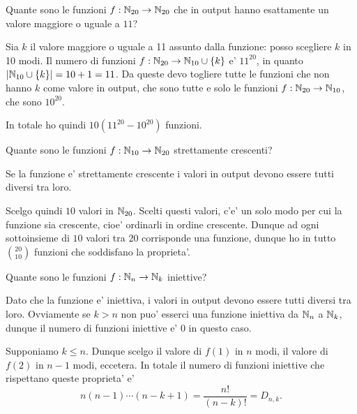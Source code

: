 \begin{example}
    Quante sono le funzioni $f : \mathbb{N}_{20} \to \mathbb{N}_{20}$ che in output hanno esattamente un valore maggiore o uguale a $11$?
\end{example}
\begin{solution}
    Sia $k$ il valore maggiore o uguale a 11 assunto dalla funzione: posso scegliere $k$ in 10 modi. Il numero di funzioni $f : \mathbb{N}_{20} \to \mathbb{N}_{10} \cup \{k\}$ e' $11^{20}$, in quanto $\left|\mathbb{N}_{10} \cup \{k\}\right| = 10 + 1 = 11$. Da queste devo togliere tutte le funzioni che non hanno $k$ come valore in output, che sono tutte e solo le funzioni $f : \mathbb{N}_{20} \to \mathbb{N}_{10}$, che sono $10^{20}$.

    In totale ho quindi $10(11^{20} - 10^{20})$ funzioni.
\end{solution}

\begin{example}
    Quante sono le funzioni $f : \mathbb{N}_{10} \to \mathbb{N}_{20}$ strettamente crescenti?
\end{example}
\begin{solution}
    Se la funzione e' strettamente crescente i valori in output devono essere tutti diversi tra loro.

    Scelgo quindi $10$ valori in $\mathbb{N}_{20}$. Scelti questi valori, c'e' un solo modo per cui la funzione sia crescente, cioe' ordinarli in ordine crescente. Dunque ad ogni sottoinsieme di $10$ valori tra $20$ corrisponde una funzione, dunque ho in tutto $\binom{20}{10}$ funzioni che soddisfano la proprieta'.
\end{solution}

\begin{example}
    Quante sono le funzioni $f : \mathbb{N}_n \to \mathbb{N}_k$ iniettive?
\end{example}
\begin{solution}
    Dato che la funzione e' iniettiva, i valori in output devono essere tutti diversi tra loro. Ovviamente se $k > n$ non puo' esserci una funzione iniettiva da $\mathbb{N}_n$ a $\mathbb{N}_k$, dunque il numero di funzioni iniettive e' 0 in questo caso.

    Supponiamo $k \leq n$. Dunque scelgo il valore di $f(1)$ in $n$ modi, il valore di $f(2)$ in $n-1$ modi, eccetera. In totale il numero di funzioni iniettive che rispettano queste proprieta' e' \[
        n(n-1) \cdots (n-k+1) = \frac{n!}{(n-k)!} = D_{n, k}.    
    \]
\end{solution}
